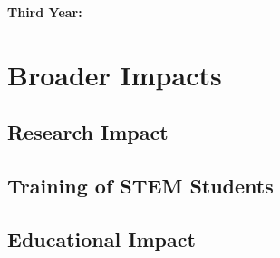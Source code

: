 \documentclass[11pt]{article}
\begin{document}
\noindent\textbf{Third Year:}  
\section{Broader Impacts}

\subsection{Research Impact}


\subsection{Training of STEM Students}

\subsection{Educational Impact}    


\newpage
\end{document}
